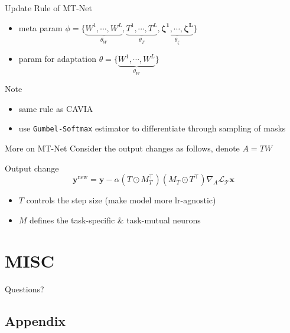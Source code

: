 \documentclass{beamer}
\begin{document}
\begin{frame}{Update Rule of MT-Net}
  \begin{itemize}
    \item meta param $\phi = \lbrace \underbrace{W^1,\cdots,W^L}_{\theta_W},\underbrace{T^1,\cdots,T^L}_{\theta_T},\underbrace{\mathbf{\zeta^1},\cdots,\mathbf{\zeta^L}}_{\theta_\zeta} \rbrace$
    \item param for adaptation $\theta = \lbrace \underbrace{W^1,\cdots,W^L}_{\theta_W} \rbrace$
  \end{itemize}

  Note
  \begin{itemize}
    \item same rule as CAVIA
    \item use \texttt{Gumbel-Softmax} estimator to differentiate through sampling of masks
  \end{itemize}
\end{frame}

\begin{frame}{More on MT-Net}
  Consider the output changes as follows, denote $A=TW$

  \begin{block}{Output change}
    \[ \mathbf{y}^{\text{new}} = \mathbf{y} - \alpha (T \odot M_T^{\top}) (M_T \odot T^{\top}) \nabla_A \mathcal{L}_{\mathcal{T}}\mathbf{x} \]
  \end{block}

  \begin{itemize}
    \item $T$ controls the step size (make model more lr-agnostic)
    \item $M$ defines the task-specific \& task-mutual neurons
  \end{itemize}
\end{frame}

\section{MISC}
\begin{frame}
	\begin{center}
    \LARGE{Questions?}
	\end{center}
\end{frame}


\subsection{Appendix}
\end{document}
